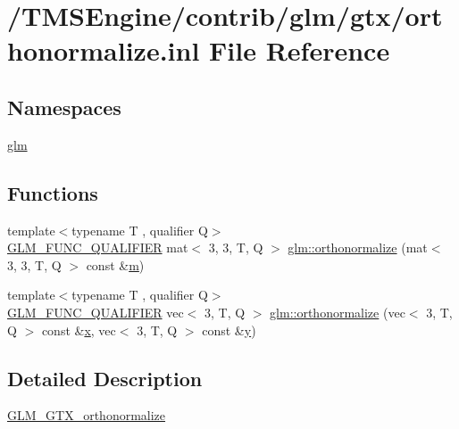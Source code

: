 \hypertarget{orthonormalize_8inl}{}\section{/\+T\+M\+S\+Engine/contrib/glm/gtx/orthonormalize.inl File Reference}
\label{orthonormalize_8inl}
\subsection*{Namespaces}
\begin{DoxyCompactItemize}
\item 
 \hyperlink{namespaceglm}{glm}
\end{DoxyCompactItemize}
\subsection*{Functions}
\begin{DoxyCompactItemize}
\item 
{\footnotesize template$<$typename T , qualifier Q$>$ }\\\hyperlink{setup_8hpp_a33fdea6f91c5f834105f7415e2a64407}{G\+L\+M\+\_\+\+F\+U\+N\+C\+\_\+\+Q\+U\+A\+L\+I\+F\+I\+ER} mat$<$ 3, 3, T, Q $>$ \hyperlink{group__gtx__orthonormalize_ga4cab5d698e6e2eccea30c8e81c74371f}{glm\+::orthonormalize} (mat$<$ 3, 3, T, Q $>$ const \&\hyperlink{_s_d_l__opengl__glext_8h_af593500c283bf1a787a6f947f503a5c2}{m})
\item 
{\footnotesize template$<$typename T , qualifier Q$>$ }\\\hyperlink{setup_8hpp_a33fdea6f91c5f834105f7415e2a64407}{G\+L\+M\+\_\+\+F\+U\+N\+C\+\_\+\+Q\+U\+A\+L\+I\+F\+I\+ER} vec$<$ 3, T, Q $>$ \hyperlink{group__gtx__orthonormalize_gac3bc7ef498815026bc3d361ae0b7138e}{glm\+::orthonormalize} (vec$<$ 3, T, Q $>$ const \&\hyperlink{_s_d_l__opengl_8h_ad0e63d0edcdbd3d79554076bf309fd47}{x}, vec$<$ 3, T, Q $>$ const \&\hyperlink{_s_d_l__opengl_8h_a1675d9d7bb68e1657ff028643b4037e3}{y})
\end{DoxyCompactItemize}


\subsection{Detailed Description}
\hyperlink{group__gtx__orthonormalize}{G\+L\+M\+\_\+\+G\+T\+X\+\_\+orthonormalize} 